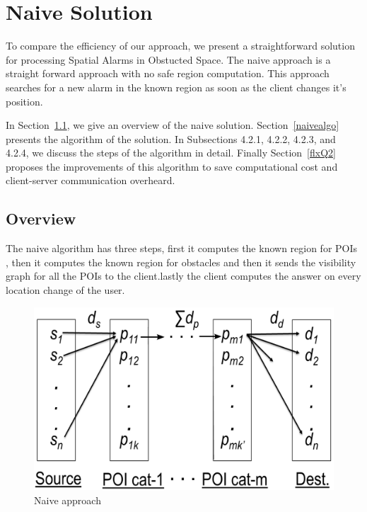 \chapter{Naive Solution}
\label{chap:naivesoln}

To compare the efficiency of our approach, we present a straightforward solution for processing Spatial Alarms in Obstucted Space. The naive approach is a straight forward approach with no safe region computation.  This approach searches for a new alarm in the known region as soon as the client changes it's position.


In Section~\ref{naiveview}, we give an overview of the naive solution. Section~\ref{naivealgo} presents the algorithm of the solution. In Subsections 4.2.1, 4.2.2, 4.2.3, and 4.2.4, we discuss the steps of the algorithm in detail. Finally Section~\ref{flxQ2} proposes the improvements of this algorithm to save computational cost and client-server communication overheard.

\vspace*{12pt}

\section{Overview}
\label{naiveview}
The naive algorithm has three steps, first it computes the known region for POIs , then it computes the known region for obstacles and then it sends the visibility graph for all the POIs to the client.lastly the client computes the answer on every location change of the user.



\begin{figure}[!htbp]
\centering
\includegraphics[width=0.7\columnwidth]{figures/soln1/naive.pdf}
\caption{Naive approach}
\label{fig:naive}
\end{figure}


\vspace*{12pt}

